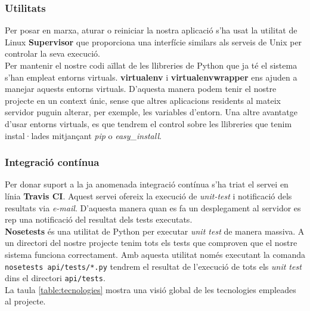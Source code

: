 	\subsubsection{Utilitats}

	Per posar en marxa, aturar o reiniciar la nostra aplicació s'ha usat la utilitat de Linux \textbf{Supervisor} \cite{supervisor} que proporciona una interfície similars als serveis de Unix per controlar la seva execució. \\

	Per mantenir el nostre codi aïllat de les llibreries de Python que ja té el sistema s'han empleat entorns virtuals. \textbf{virtualenv} \cite{virtualenv} i \textbf{virtualenvwrapper} \cite{virtualenvwrapper} ens ajuden a manejar aquests entorns virtuals. D'aquesta manera podem tenir el nostre projecte en un context únic, sense que altres aplicacions residents al mateix servidor puguin alterar, per exemple, les variables d'entorn. Una altre avantatge d'usar entorns virtuals, es que tendrem el control sobre les llibreries que tenim instal·lades mitjançant \emph{pip} o \emph{easy\_install}.\\

	\subsubsection{Integració contínua}

	Per donar suport a la ja anomenada integració contínua s'ha triat el servei en línia \textbf{Travis CI}. \cite{travis_ci} Aquest servei ofereix la execució de \emph{unit-test} i notificació dels resultats via \emph{e-mail}. D'aquesta manera quan es fa un desplegament al servidor es rep una notificació del resultat dels tests executats.\\
	
	\textbf{Nosetests} \cite{nose} és una utilitat de Python per executar \emph{unit test} de manera massiva. A un directori del nostre projecte tenim tots els tests que comproven que el nostre sistema funciona correctament. Amb aquesta utilitat només executant la comanda \texttt{nosetests api/tests/*.py} tendrem el resultat de l'execució de tots els \emph{unit test} dins el directori \texttt{api/tests}.\\
	
	La taula \ref{table:tecnologies} mostra una visió global de les tecnologies empleades al projecte.

